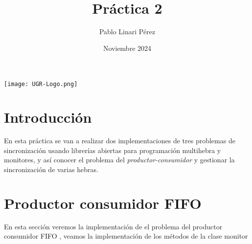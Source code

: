 \documentclass{article}
\title{Práctica 2}
\author{Pablo Linari Pérez}
\date{Noviembre 2024}
\begin{document}
\maketitle
\begin{center}
    \texttt{[image: UGR-Logo.png]} %
\end{center}
\newpage
\tableofcontents

\newpage

\section{Introducción}
En esta práctica se van a realizar dos implementaciones de tres problemas de sincronización usando librerías abiertas para programación multihebra y monitores, y así conocer el problema del \textit{productor-consumidor} y gestionar la sincronización de varias hebras. 
\section{Productor consumidor FIFO}
En esta sección veremos la implementación de el problema del productor consumidor FIFO , veamos la implementación de los métodos de la clase monitor
\end{document}
